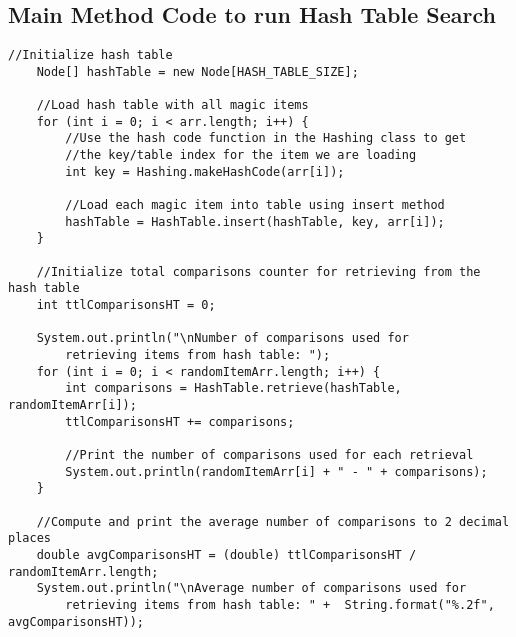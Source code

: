 \documentclass[letterpaper, 10pt,DIV=13]{scrartcl}
\numberwithin{equation}{section} %
\numberwithin{figure}{section} %
\numberwithin{table}{section} %
\begin{document}
\subsection{Main Method Code to run Hash Table Search}
\lstset{numbers=left, numberstyle=\tiny, stepnumber=1, numbersep=5pt, basicstyle=\footnotesize\ttfamily}
\begin{lstlisting}[frame=single, ] 
    //Initialize hash table
    Node[] hashTable = new Node[HASH_TABLE_SIZE];

    //Load hash table with all magic items
    for (int i = 0; i < arr.length; i++) { 
        //Use the hash code function in the Hashing class to get 
        //the key/table index for the item we are loading
        int key = Hashing.makeHashCode(arr[i]);
        
        //Load each magic item into table using insert method
        hashTable = HashTable.insert(hashTable, key, arr[i]);
    }

    //Initialize total comparisons counter for retrieving from the hash table
    int ttlComparisonsHT = 0;

    System.out.println("\nNumber of comparisons used for
        retrieving items from hash table: ");
    for (int i = 0; i < randomItemArr.length; i++) {
        int comparisons = HashTable.retrieve(hashTable, randomItemArr[i]);
        ttlComparisonsHT += comparisons;
        
        //Print the number of comparisons used for each retrieval
        System.out.println(randomItemArr[i] + " - " + comparisons);
    }

    //Compute and print the average number of comparisons to 2 decimal places
    double avgComparisonsHT = (double) ttlComparisonsHT / randomItemArr.length;
    System.out.println("\nAverage number of comparisons used for
        retrieving items from hash table: " +  String.format("%.2f", avgComparisonsHT));
\end{lstlisting}
\end{document}
